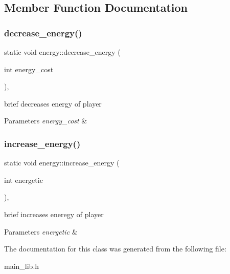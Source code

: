 \subsection{Member Function Documentation}
\mbox{\label{classenergy_a56d07f16cd58bbd82ff749fe010cbfd9}} 
\subsubsection{\texorpdfstring{decrease\+\_\+energy()}{decrease\_energy()}}
{\footnotesize\ttfamily static void energy\+::decrease\+\_\+energy (\begin{DoxyParamCaption}\item[{int}]{energy\+\_\+cost }\end{DoxyParamCaption})\hspace{0.3cm}{\ttfamily [inline]}, {\ttfamily [static]}}

brief decreases energy of player 
\begin{DoxyParams}{Parameters}
{\em energy\+\_\+cost} & \\
\hline
\end{DoxyParams}
\mbox{\label{classenergy_a25298716dddd75c94bd034cc5f23033c}} 
\subsubsection{\texorpdfstring{increase\+\_\+energy()}{increase\_energy()}}
{\footnotesize\ttfamily static void energy\+::increase\+\_\+energy (\begin{DoxyParamCaption}\item[{int}]{energetic }\end{DoxyParamCaption})\hspace{0.3cm}{\ttfamily [inline]}, {\ttfamily [static]}}

brief increases eneregy of player 
\begin{DoxyParams}{Parameters}
{\em energetic} & \\
\hline
\end{DoxyParams}


The documentation for this class was generated from the following file\+:\begin{DoxyCompactItemize}
\item 
main\+\_\+lib.\+h\end{DoxyCompactItemize}
